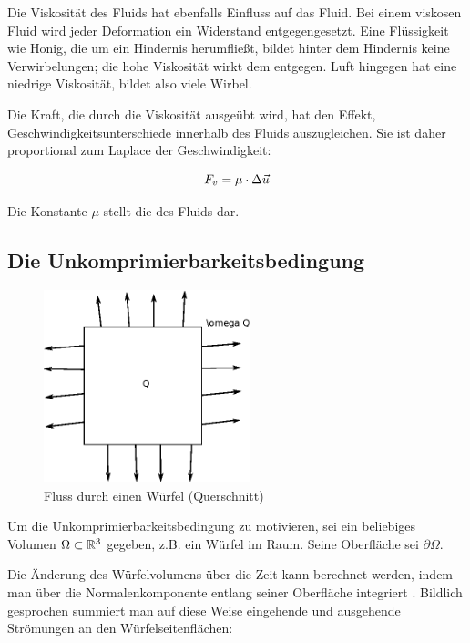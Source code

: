 Die Viskosität des Fluids hat ebenfalls Einfluss auf das Fluid. Bei einem
viskosen Fluid wird jeder Deformation ein Widerstand entgegengesetzt. Eine
Flüssigkeit wie Honig, die um ein Hindernis herumfließt, bildet hinter dem
Hindernis keine Verwirbelungen; die hohe Viskosität wirkt dem entgegen. Luft
hingegen hat eine niedrige Viskosität, bildet also viele Wirbel.


Die Kraft, die durch die Viskosität ausgeübt wird, hat den Effekt,
Geschwindigkeitsunterschiede innerhalb des Fluids auszugleichen. Sie ist
daher proportional zum Laplace der Geschwindigkeit:

\begin{equation}
\label{eq:navier_stokes_f_v}
F_v = \mu \cdot \Delta \vec{u}
\end{equation}

Die Konstante $\mu$ stellt die  des Fluids
dar.

\subsection{Die Unkomprimierbarkeitsbedingung}
\label{sec:mathematics_incompressibility_condition_section}

\begin{figure}[ht]
\includegraphics[width=6cm]{images/incompressibility_condition_example}
\caption{Fluss durch einen Würfel (Querschnitt)}
\end{figure}

Um die Unkomprimierbarkeitsbedingung zu motivieren, sei ein beliebiges Volumen
$\Omega \subset \mathbb{R}^3$ gegeben, z.B. ein Würfel im Raum. Seine
Oberfläche sei $\partial \Omega$.

Die Änderung des Würfelvolumens über die Zeit kann berechnet werden, indem man
über die Normalenkomponente entlang seiner Oberfläche integriert \cite{Chorin1980}. Bildlich
gesprochen summiert man auf diese Weise eingehende und ausgehende Strömungen an
den Würfelseitenflächen:

